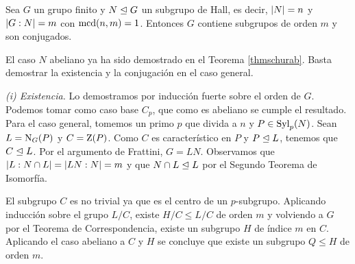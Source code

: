 \begin{teorema}\label{thm:schur} Sea $G$ un grupo finito y $N\trianglelefteq G$ un subgrupo de Hall, es decir, $\left|N\right|=n$ y $\left|G:N\right|=m$ con $\operatorname{mcd}(n,m)=1$. Entonces $G$ contiene subgrupos de orden $m$ y son conjugados. %
	\begin{demostracion}
		El caso $N$ abeliano ya ha sido demostrado en el Teorema \ref{thmschurab}. Basta demostrar la existencia y la conjugación en el caso general.
		
		\textit{(i) Existencia.} Lo demostramos por inducción fuerte sobre el orden de $G$. 
		Podemos tomar como caso base $C_p$, que como es abeliano se cumple el resultado. 
		Para el caso general, tomemos un primo $p$ que divida a $n$ y $P\in \operatorname{Syl}_p(N)$. Sean $L=\operatorname{N}_G(P)$ y $C=\operatorname{Z}(P)$.
		Como $C$ es característico en $P$ y $P\trianglelefteq L$, tenemos que $C\trianglelefteq L$.
		Por el argumento de Frattini, $G=LN$.
		Observamos que $\left|L:N\cap L\right| = \left|LN:N\right| = m$ y que $N\cap L \trianglelefteq L$ por el Segundo Teorema de Isomorfía.
		
		El subgrupo $C$ es no trivial ya que es el centro de un $p$-subgrupo. Aplicando inducción sobre el grupo $L/C$, existe $H/C\leq L/C$ de orden $m$ y volviendo a $G$ por el Teorema de Correspondencia, existe un subgrupo $H$ de índice $m$ en $C$. Aplicando el caso abeliano a $C$ y $H$ se concluye que existe un subgrupo $Q\leq H$ de orden $m$.
%				
%				
%				
%	
		

\end{demostracion}
\end{teorema}
